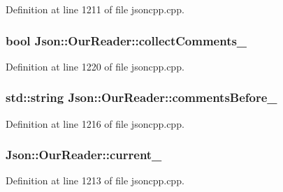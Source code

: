Definition at line 1211 of file jsoncpp.\+cpp.

\subsubsection[{\texorpdfstring{collect\+Comments\+\_\+}{collectComments_}}]{\setlength{\rightskip}{0pt plus 5cm}bool Json\+::\+Our\+Reader\+::collect\+Comments\+\_\+\hspace{0.3cm}{\ttfamily [private]}}\hypertarget{class_json_1_1_our_reader_a259f6ac988da2894bcafc670e42f73ad}{}\label{class_json_1_1_our_reader_a259f6ac988da2894bcafc670e42f73ad}


Definition at line 1220 of file jsoncpp.\+cpp.

\subsubsection[{\texorpdfstring{comments\+Before\+\_\+}{commentsBefore_}}]{\setlength{\rightskip}{0pt plus 5cm}std\+::string Json\+::\+Our\+Reader\+::comments\+Before\+\_\+\hspace{0.3cm}{\ttfamily [private]}}\hypertarget{class_json_1_1_our_reader_a2e8fd643b2e85155f5292db8fc9c6084}{}\label{class_json_1_1_our_reader_a2e8fd643b2e85155f5292db8fc9c6084}


Definition at line 1216 of file jsoncpp.\+cpp.

\subsubsection[{\texorpdfstring{current\+\_\+}{current_}}]{ Json\+::\+Our\+Reader\+::current\+\_\+\hspace{0.3cm}{\ttfamily [private]}}\hypertarget{class_json_1_1_our_reader_a5211fbbba94be80a22dd2317c621efcc}{}\label{class_json_1_1_our_reader_a5211fbbba94be80a22dd2317c621efcc}


Definition at line 1213 of file jsoncpp.\+cpp.

